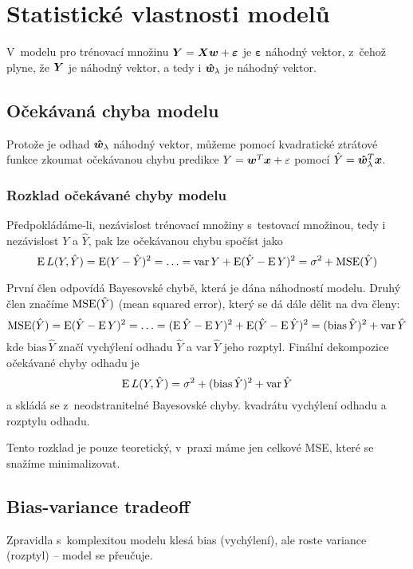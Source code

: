 \section{Statistické vlastnosti modelů}

V~modelu pro trénovací množinu $\bm{Y} = \bm{X}\bm{w} + \bm{\varepsilon}$ je $\bm{\varepsilon}$ náhodný vektor, z~čehož plyne, že $\bm{Y}$ je náhodný vektor, a tedy i $\bm{\hat{w}}_\lambda$ je náhodný vektor.

\subsection{Očekávaná chyba modelu}

Protože je odhad $\bm{\hat{w}}_\lambda$ náhodný vektor, můžeme pomocí kvadratické ztrátové funkce zkoumat očekávanou chybu predikce $Y = \bm{w}^T\bm{x} + \varepsilon$ pomocí $\hat{Y} = \bm{\hat{w}}_\lambda^T \bm{x}$.

\subsubsection{Rozklad očekávané chyby modelu}

Předpokládáme-li, nezávislost trénovací množiny s~testovací množinou, tedy i nezávislost $Y$ a $\hat{Y}$, pak lze očekávanou chybu spočíst jako
\[
    \operatorname{E} L(Y, \hat{Y}) = \operatorname{E} (Y - \hat{Y})^2 = \ldots
    = \textrm{var}\,Y + \operatorname{E} (\hat{Y} - \operatorname{E} Y)^2
    = \sigma^2 + \operatorname{MSE}(\hat{Y})
\]

První člen odpovídá Bayesovské chybě, která je dána náhodností modelu. Druhý člen značíme $\operatorname{MSE}(\hat{Y})$ (mean squared error), který se dá dále dělit na dva členy:
\[
    \operatorname{MSE}(\hat{Y}) = \operatorname{E} (\hat{Y} - \operatorname{E} Y)^2 = \ldots
    = (\operatorname{E}\hat{Y} - \operatorname{E} Y)^2 + \operatorname{E}(\hat{Y} - \operatorname{E}\hat{Y})^2
    = (\text{bias}\,\hat{Y})^2 + \text{var}\,\hat{Y}
\]
kde $\text{bias}\,\hat{Y}$ značí vychýlení odhadu $\hat{Y}$ a $\text{var}\,\hat{Y}$ jeho rozptyl. Finální dekompozice očekávané chyby odhadu je
\[
    \operatorname{E} L(Y, \hat{Y}) = \sigma^2 + (\text{bias}\,\hat{Y})^2 + \text{var}\,\hat{Y}
\]
a skládá se z~neodstranitelné Bayesovské chyby. kvadrátu vychýlení odhadu a rozptylu odhadu.

Tento rozklad je pouze teoretický, v~praxi máme jen celkové MSE, které se snažíme minimalizovat.

\subsection{Bias-variance tradeoff}

Zpravidla s~komplexitou modelu klesá bias (vychýlení), ale roste variance (rozptyl) -- model se přeučuje.

